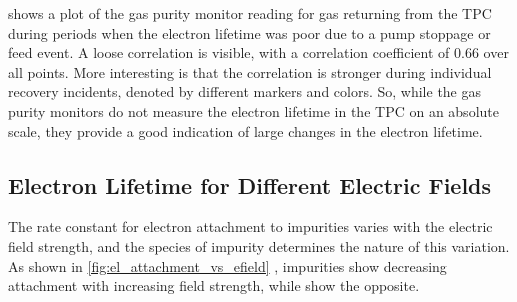 \documentclass[herrin-thesis.tex]{subfiles}
\begin{document}
 shows a plot of the gas purity monitor reading for gas returning from the TPC during periods when the electron lifetime was poor due to a pump stoppage or feed event. A loose correlation is visible, with a correlation coefficient of 0.66 over all points. More interesting is that the correlation is stronger during individual recovery incidents, denoted by different markers and colors. So, while the gas purity monitors do not measure the electron lifetime in the TPC on an absolute scale, they provide a good indication of large changes in the electron lifetime.

\subsection{Electron Lifetime for Different Electric Fields}
\label{subsec:el_lowfield}
The rate constant for electron attachment to impurities varies with the electric field strength, and the species of impurity determines the nature of this variation. As shown in \cref{fig:el_attachment_vs_efield} \cite{Bakale:1976ly},  impurities show decreasing attachment with increasing field strength, while  show the opposite.
\end{document}
